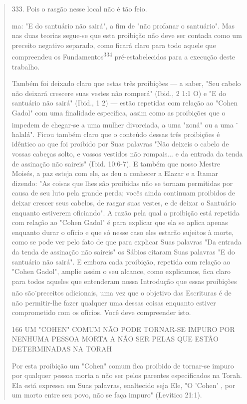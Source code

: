 \begin{quote}
333. Pois o rasgão nesse local não é tão feio.

ma: "E do santuário não sairá", a fim de "não profanar o santuário". Mas
nas duas teorias segue-se que esta proibição não deve ser contada como
um precei­to negativo separado, como ficará claro para todo aquele que
compreendeu os Fundamentos\textsuperscript{334} pré-estabelecidos para a
execução deste trabalho.

Também foi deixado claro que estas três proibições --- a saber, "Seu
cabelo não deixará crescere suas vestes não romperá" (Ibid., 2 1:1 O) e
"E do santuário não sairá" (Ibid., 1 2) --- estão repetidas com relação
ao "Cohen Ga­dol" com uma finalidade específica, assim como as
proibições que o impedem de chegar-se a uma mulher divorciada, a uma
"zoná" ou a uma \textsuperscript{-}halalá". Ficou também claro que o
conteúdo dessas três proibições é idêntico ao que foi proi­bido por Suas
palavras "Não deixeis o cabelo de vossas cabeças solto, e vossos
vestidos não rompais... e da entrada da tenda de assinação não saireis"
(Ibid. 10:6-7). E também que nosso Mestre Moisés, a paz esteja com ele,
as deu a co­nhecer a Elazar e a Itamar dizendo: "As coisas que lhes são
proibidas não se tornam permitidas por causa de seu luto pela grande
perda; vocês ainda conti­nuam proibidos de deixar crescer seus cabelos,
de rasgar suas vestes, e de dei­xar o Santuário enquanto estiverem
oficiando". A razão pela qual a proibição está repetida com relação ao
"Cohen Gadol" é para explicar que ela se aplica apenas enquanto durar o
ofício e que só nesse caso eles estarão sujeitos à mor­te, como se pode
ver pelo fato de que para explicar Suas palavras "Da entrada da tenda de
assinação não saireis" os Sábios citaram Suas palavras "E do san­tuário
não sairá". E embora cada proibição, repetida com relação ao "Cohen
Gadol", amplie assim o seu alcance, como explicamos, fica claro para
todos aqueles que entenderam nossa Introdução que essas proibições não
são\textsuperscript{-}precei­tos adicionais, uma vez que o objetivo das
Escrituras é de não permitir-lhe fa­zer qualquer uma dessas coisas
enquanto estiver comprometido com os ofícios. Você deve compreender
isto.

166 UM "COHEN" COMUM NÃO PODE TORNAR-SE IMPURO POR NENHUMA PESSOA MORTA
A NÃO SER PELAS QUE ESTÃO DETERMINADAS NA TORAH

Por esta proibição um "Cohen" comum fica proibido de tornar-se impuro
por qualquer pessoa morta a não ser pelos parentes especificados na
Torah. Ela está expressa em Suas palavras, enaltecido seja Ele, "O
'Cohen' , por um morto entre seu povo, não se faça impuro" (Levítico
21:1).


\end{quote}
